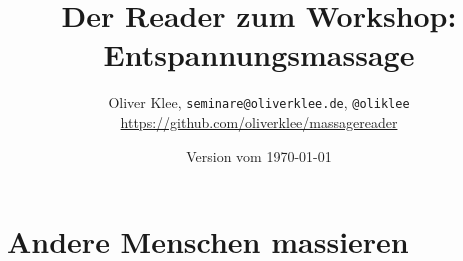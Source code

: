 \documentclass[a4paper,twoside,11pt,titlepage,openany]{scrbook}
\author{Oliver Klee, \texttt{seminare@oliverklee.de}, \texttt{@oliklee}\\\url{https://github.com/oliverklee/massagereader}}
\title{Der Reader zum Workshop: Entspannungsmassage}
\date{Version vom \today}
\begin{document}
\nocite*{}

\maketitle
\frontmatter





\tableofcontents

\mainmatter



\chapter{Andere Menschen massieren}

\newpage



\newpage


\newpage


\newpage





\backmatter

\end{document}
